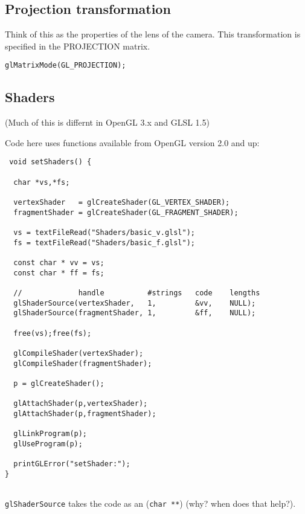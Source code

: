 \documentclass[12pt]{article}
\begin{document}
\subsection{Projection transformation} 
Think of this as the properties of the lens of the camera. 
This transformation is specified in the PROJECTION matrix. 

\begin{small}
\begin{verbatim}
glMatrixMode(GL_PROJECTION);
\end{verbatim}
\end{small}       

                       
\subsection{Shaders}
 (Much of this is differnt in OpenGL 3.x and GLSL 1.5) 

Code here uses functions available from OpenGL version 2.0 and up: 

\begin{small}
\begin{verbatim}
 void setShaders() {
	
  char *vs,*fs;
	
  vertexShader   = glCreateShader(GL_VERTEX_SHADER);
  fragmentShader = glCreateShader(GL_FRAGMENT_SHADER);	
	
  vs = textFileRead("Shaders/basic_v.glsl");
  fs = textFileRead("Shaders/basic_f.glsl");
	
  const char * vv = vs;
  const char * ff = fs;
	
  //             handle          #strings   code    lengths 
  glShaderSource(vertexShader,   1,         &vv,    NULL);
  glShaderSource(fragmentShader, 1,         &ff,    NULL);
	
  free(vs);free(fs);
	
  glCompileShader(vertexShader);
  glCompileShader(fragmentShader);
	
  p = glCreateShader();
		
  glAttachShader(p,vertexShader);
  glAttachShader(p,fragmentShader);
	
  glLinkProgram(p);
  glUseProgram(p);
  
  printGLError("setShader:");
}


\end{verbatim}
\end{small}               

{\tt glShaderSource} takes the code as an ({\tt char **}) (why? when does that help?).   
\end{document}
